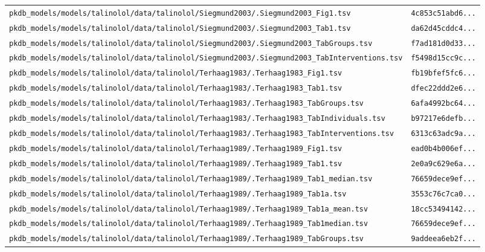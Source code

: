 \begin{longtable}{ll}
\texttt{pkdb\_models/models/talinolol/data/talinolol/Siegmund2003/.Siegmund2003\_Fig1.tsv} & \texttt{4c853c51abd6...} \\
\texttt{pkdb\_models/models/talinolol/data/talinolol/Siegmund2003/.Siegmund2003\_Tab1.tsv} & \texttt{da62d45cddc4...} \\
\texttt{pkdb\_models/models/talinolol/data/talinolol/Siegmund2003/.Siegmund2003\_TabGroups.tsv} & \texttt{f7ad181d0d33...} \\
\texttt{pkdb\_models/models/talinolol/data/talinolol/Siegmund2003/.Siegmund2003\_TabInterventions.tsv} & \texttt{f5498d15cc9c...} \\
\texttt{pkdb\_models/models/talinolol/data/talinolol/Terhaag1983/.Terhaag1983\_Fig1.tsv} & \texttt{fb19bfef5fc6...} \\
\texttt{pkdb\_models/models/talinolol/data/talinolol/Terhaag1983/.Terhaag1983\_Tab1.tsv} & \texttt{dfec22ddd2e6...} \\
\texttt{pkdb\_models/models/talinolol/data/talinolol/Terhaag1983/.Terhaag1983\_TabGroups.tsv} & \texttt{6afa4992bc64...} \\
\texttt{pkdb\_models/models/talinolol/data/talinolol/Terhaag1983/.Terhaag1983\_TabIndividuals.tsv} & \texttt{b97217e6defb...} \\
\texttt{pkdb\_models/models/talinolol/data/talinolol/Terhaag1983/.Terhaag1983\_TabInterventions.tsv} & \texttt{6313c63adc9a...} \\
\texttt{pkdb\_models/models/talinolol/data/talinolol/Terhaag1989/.Terhaag1989\_Fig1.tsv} & \texttt{ead0b4b006ef...} \\
\texttt{pkdb\_models/models/talinolol/data/talinolol/Terhaag1989/.Terhaag1989\_Tab1.tsv} & \texttt{2e0a9c629e6a...} \\
\texttt{pkdb\_models/models/talinolol/data/talinolol/Terhaag1989/.Terhaag1989\_Tab1\_median.tsv} & \texttt{76659dece9ef...} \\
\texttt{pkdb\_models/models/talinolol/data/talinolol/Terhaag1989/.Terhaag1989\_Tab1a.tsv} & \texttt{3553c76c7ca0...} \\
\texttt{pkdb\_models/models/talinolol/data/talinolol/Terhaag1989/.Terhaag1989\_Tab1a\_mean.tsv} & \texttt{18cc53494142...} \\
\texttt{pkdb\_models/models/talinolol/data/talinolol/Terhaag1989/.Terhaag1989\_Tab1median.tsv} & \texttt{76659dece9ef...} \\
\texttt{pkdb\_models/models/talinolol/data/talinolol/Terhaag1989/.Terhaag1989\_TabGroups.tsv} & \texttt{9addeea6eb2f...} \\

\end{longtable}

